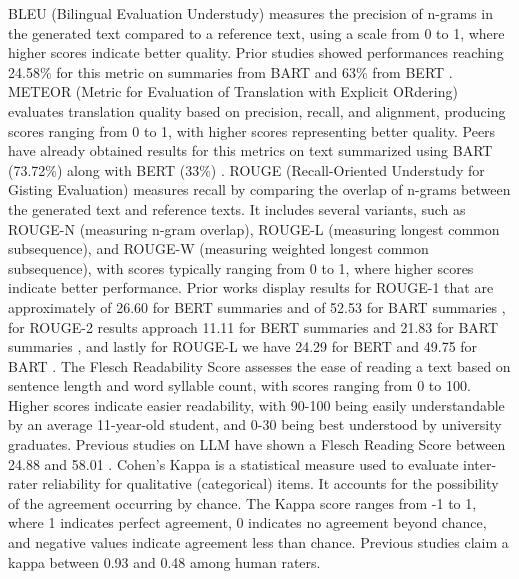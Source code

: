\documentclass[preprint,12pt]{elsarticle}
\begin{document}
BLEU (Bilingual Evaluation Understudy) measures the precision of n-grams in the generated text compared to a reference text, using a scale from 0 to 1, where higher scores indicate better quality. Prior studies showed performances reaching 24.58\% for this metric on summaries from BART \cite{Myla2024} and 63\% from BERT \cite{Caparros-Laiz2023} . METEOR (Metric for Evaluation of Translation with Explicit ORdering) evaluates translation quality based on precision, recall, and alignment, producing scores ranging from 0 to 1, with higher scores representing better quality. Peers have already obtained  results for this metrics on text summarized using BART (73.72\%) \cite{Myla2024} along with BERT (33\%) \cite{Roy2023}. ROUGE (Recall-Oriented Understudy for Gisting Evaluation) measures recall by comparing the overlap of n-grams between the generated text and reference texts. It includes several variants, such as ROUGE-N (measuring n-gram overlap), ROUGE-L (measuring longest common subsequence), and ROUGE-W (measuring weighted longest common subsequence), with scores typically ranging from 0 to 1, where higher scores indicate better performance. Prior works display results for ROUGE-1 that are approximately of 26.60 for BERT summaries and of 52.53 for BART summaries \cite{Guo2021}, for ROUGE-2 results approach 11.11 for BERT summaries and 21.83 for BART summaries  \cite{Guo2021}, and lastly for ROUGE-L we have 24.29 for BERT and 49.75 for BART  \cite{Guo2021}.   The Flesch Readability Score assesses the ease of reading a text based on sentence length and word syllable count, with scores ranging from 0 to 100. Higher scores indicate easier readability, with 90-100 being easily understandable by an average 11-year-old student, and 0-30 being best understood by university graduates. Previous studies on LLM have shown a Flesch Reading Score between 24.88 and 58.01 \cite{Wang2023}. Cohen's Kappa is a statistical measure used to evaluate inter-rater reliability for qualitative (categorical) items. It accounts for the possibility of the agreement occurring by chance. The Kappa score ranges from -1 to 1, where 1 indicates perfect agreement, 0 indicates no agreement beyond chance, and negative values indicate agreement less than chance. Previous studies claim a kappa between 0.93 \cite{Naismith2023} and 0.48 \cite{Gomez2023} among human raters. \\
\end{document}
